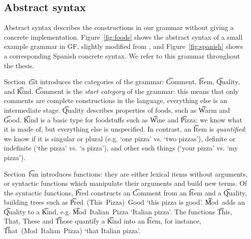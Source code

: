 \subsection{Abstract syntax}


Abstract syntax describes the constructions in our grammar without
giving a concrete implementation. Figure~\ref{fig:foods}
shows the abstract syntax of a small example grammar in GF, slightly
modified from \cite{ranta2011gfbook}, and Figure~\ref{fig:spanish}
shows a corresponding Spanish concrete syntax. We refer to this
grammar throughout the thesis. 

Section~\t{cat} introduces the categories of the grammar: \t{Comment},
\t{Item},  \t{Quality}, and \t{Kind}.  \t{Comment} is the \emph{start
  category} of the grammar: this means that only comments are complete
constructions in the language, everything else is an intermediate
stage. \t{Quality} describes properties of foods, such as
\t{Warm} and \t{Good}. %
\t{Kind} is a basic type for foodstuffs such as \t{Wine} and
\t{Pizza}: we know what it is made of, but everything else is
unspecified. In contrast, an \t{Item} is \emph{quantified}: we know if
it is singular or plural (e.g. `one pizza' vs. `two pizzas'), definite or
indefinite (`the pizza' vs. `a pizza'), and other such things (`your
pizza' vs. `my pizza'). 

Section~\t{fun} introduces functions: they are either lexical
items without arguments, or syntactic functions which manipulate their
arguments and build new terms. Of the syntactic functions, \t{Pred}
constructs an \t{Comment} from an \t{Item} and a \t{Quality},
building trees such as \t{Pred~(This~Pizza)~Good} `this pizza is
good'. 
\t{Mod}~adds an \t{Quality} to a \t{Kind}, e.g. \t{Mod~Italian~Pizza}
`Italian pizza'. The functions  \t{This, That, These} 
and \t{Those} quantify a \t{Kind} into an \t{Item}, for instance,
\t{That~(Mod~Italian~Pizza)} `that Italian pizza'.

